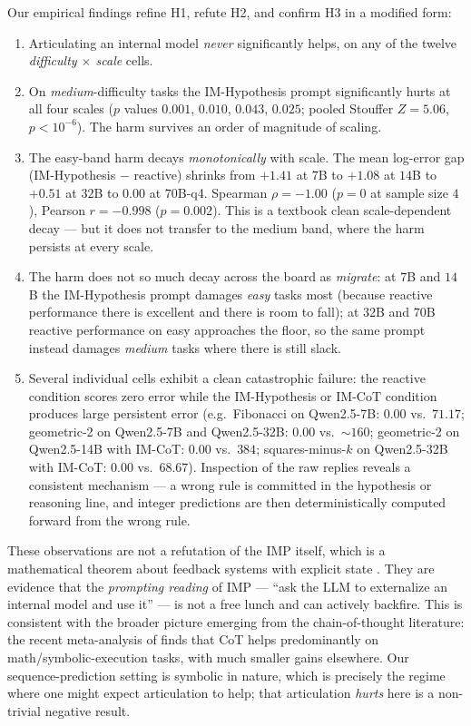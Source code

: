 \documentclass[11pt]{article}
\begin{document}
Our empirical findings refine H1, refute H2, and confirm H3 in a
modified form:
\begin{enumerate}[leftmargin=2em,itemsep=0pt,topsep=2pt]
\item Articulating an internal model \emph{never} significantly helps,
  on any of the twelve \emph{difficulty $\times$ scale} cells.
\item On \emph{medium}-difficulty tasks the IM-Hypothesis prompt
  significantly hurts at all four scales ($p$ values $0.001$, $0.010$,
  $0.043$, $0.025$; pooled Stouffer $Z = 5.06$, $p < 10^{-6}$).  The
  harm survives an order of magnitude of scaling.
\item The easy-band harm decays \emph{monotonically} with scale.
  The mean log-error gap (IM-Hypothesis $-$ reactive) shrinks from
  $+1.41$ at $7$B to $+1.08$ at $14$B to $+0.51$ at $32$B to $0.00$
  at $70$B-q4.  Spearman $\rho = -1.00$ ($p = 0$ at sample size $4$),
  Pearson $r = -0.998$ ($p = 0.002$).  This is a textbook clean
  scale-dependent decay --- but it does not transfer to the medium
  band, where the harm persists at every scale.
\item The harm does not so much decay across the board as
  \emph{migrate}: at $7$B and $14$B the IM-Hypothesis prompt damages
  \emph{easy} tasks most (because reactive performance there is
  excellent and there is room to fall); at $32$B and $70$B reactive
  performance on easy approaches the floor, so the same prompt
  instead damages \emph{medium} tasks where there is still slack.
\item Several individual cells exhibit a clean catastrophic failure:
  the reactive condition scores zero error while the IM-Hypothesis
  or IM-CoT condition produces large persistent error
  (e.g.\ Fibonacci on Qwen2.5-7B: $0.00$ vs.\ $71.17$;
  geometric-2 on Qwen2.5-7B and Qwen2.5-32B: $0.00$ vs.\ $\sim 160$;
  geometric-2 on Qwen2.5-14B with IM-CoT: $0.00$ vs.\ $384$;
  squares-minus-$k$ on Qwen2.5-32B with IM-CoT: $0.00$ vs.\ $68.67$).
  Inspection of the raw replies reveals a consistent mechanism ---
  a wrong rule is committed in the hypothesis or reasoning line, and
  integer predictions are then deterministically computed forward
  from the wrong rule.
\end{enumerate}

These observations are not a refutation of the IMP itself, which is a
mathematical theorem about feedback systems with explicit state
\citep{francis1976internal}.  They are evidence that the
\emph{prompting reading} of IMP --- ``ask the LLM to externalize an
internal model and use it'' --- is not a free lunch and can
actively backfire.  This is consistent with the broader picture
emerging from the chain-of-thought literature: the recent
meta-analysis of \citet{sprague2024cot} finds that CoT helps
predominantly on math/symbolic-execution tasks, with much smaller
gains elsewhere.  Our sequence-prediction setting is symbolic in
nature, which is precisely the regime where one might expect
articulation to help; that articulation \emph{hurts} here is a
non-trivial negative result.
\end{document}
